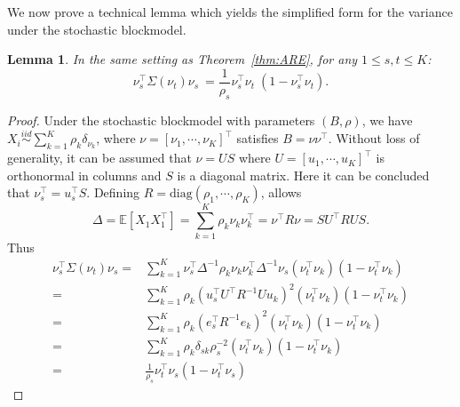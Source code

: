 \documentclass[journal,twoside,web]{ieeecolor}
\newtheorem{lemma}[fact]{Lemma}
\renewcommand{\Re}{\mathbb{R}}
\newcommand{\Ex}{\mathbb{E}}
\begin{document}
We now prove a technical lemma which yields the simplified form for the variance under the stochastic blockmodel.

\begin{lemma}
\label{lm:mseForm}
In the same setting as Theorem~\ref{thm:ARE}, for any $1 \le s, t \le K$:
\[
	\nu_s^{\top} \Sigma(\nu_t) \nu_s^{\phantom{\top}} = \frac{1}{\rho_s} \nu_s^{\top} \nu_t^{\phantom{\top}} (1- \nu_s^{\top} \nu_t).
\]
\end{lemma}
\begin{proof}
Under the stochastic blockmodel with parameters $(B, \rho)$, we have $X_i \stackrel{iid}{\sim} \sum_{k=1}^K \rho_k \delta_{\nu_k}$, where $\nu = [\nu_1, \cdots, \nu_K]^{\top}$ satisfies $B = \nu \nu^{\top}$. Without loss of generality, it can be assumed that $\nu = U S$ where $U = [u_1, \cdots, u_K]^{\top}$ is orthonormal in columns and $S$ is a diagonal matrix. Here it can be concluded that $\nu_s^{\top} = u_s^{\top} S$. Defining $R = \text{diag}(\rho_1, \cdots, \rho_K)$, allows
\[
	\Delta = \Ex[X_1 X_1^{\top}] = \sum_{k=1}^K \rho_k \nu_k \nu_k^{\top} = \nu^{\top} R \nu = S U^{\top} R U S.
\]
Thus
\begin{align*}
	\nu_s^{\top} \Sigma(\nu_t) \nu_s = &
     \sum_{k=1}^K \nu_s^{\top} \Delta^{-1} \rho_k \nu_k \nu_k^{\top} \Delta^{-1} \nu_s (\nu_t^{\top} \nu_k)(1 - \nu_t^{\top} \nu_k) \\
    = & \sum_{k=1}^K \rho_k (u_s^{\top} U^{\top} R^{-1} U u_k)^2 (\nu_t^{\top} \nu_k) (1 - \nu_t^{\top} \nu_k) \\
    = & \sum_{k=1}^K \rho_k (e_s^{\top} R^{-1} e_k)^2 (\nu_t^{\top} \nu_k) (1 - \nu_t^{\top} \nu_k) \\
    = & \sum_{k=1}^K \rho_k \delta_{sk} \rho_s^{-2} (\nu_t^{\top} \nu_k) (1 - \nu_t^{\top} \nu_k) \\
    = & \frac{1}{\rho_s} \nu_t^{\top} \nu_s (1 - \nu_t^{\top} \nu_s)
\end{align*}
\end{proof}

\end{document}
